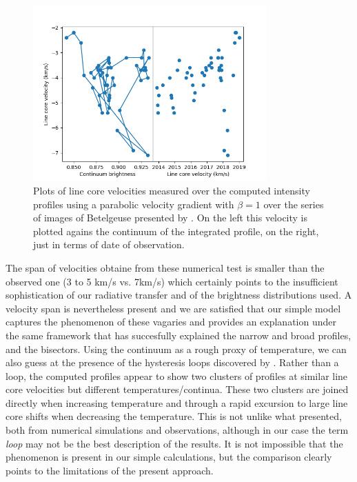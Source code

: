 \documentclass{/Users/art2/TeX/aanda/aa}
\begin{document}
\begin{figure}
   \includegraphics[width=0.8\textwidth]{Histeresis.png}
   \caption{Plots of line core velocities measured over the computed intensity profiles using a parabolic velocity gradient with $\beta=1$ over the 
   series of images of Betelgeuse presented by \cite{auriere_discovery_2016}\cite{lopez_ariste_height_2023}. On the left this velocity is plotted 
   agains the continuum of the integrated profile, on the right, just in terms of date of observation. }
   \label{hysteresis}
   \end{figure}

The span of velocities obtaine from these numerical test is smaller than the observed one (3 to 5 km/s vs. 7km/s) which certainly points to the insufficient 
sophistication of our radiative transfer and of the brightness distributions used. A velocity span is nevertheless present and we are satisfied that 
our simple model captures the phenomenon of these vagaries and provides an explanation under the same framework that has succesfully explained the narrow 
and broad profiles, and the bisectors. Using the continuum as a rough proxy of temperature, we can also guess at the presence of the hysteresis loops 
discovered by \cite{kravchenko_tomography_2018}. Rather than a loop, the computed profiles appear to show two clusters of profiles at similar line core 
velocities but different temperatures/continua. These two clusters are joined directly when increasing temperature and through a rapid excursion to 
large line core shifts when decreasing the temperature. This is not unlike what \cite{kravchenko_tomography_2019} presented, both from numerical simulations
and observations, although in our case the term \textit{loop} may not be the best description of the results. It is not impossible that the phenomenon 
is present in our simple calculations, but the comparison clearly points to the limitations of the present approach.
\end{document}
